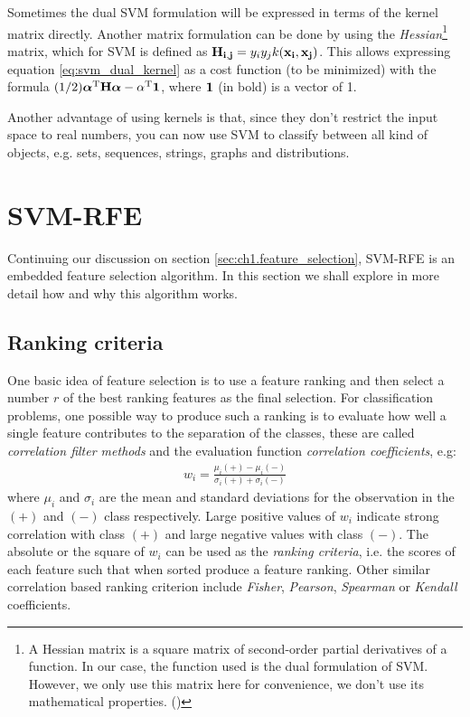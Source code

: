 Sometimes the dual SVM formulation will be expressed in terms of the kernel matrix directly. Another matrix formulation can be done by using the \emph{Hessian}\footnote{A Hessian matrix is a square matrix of second-order partial derivatives of a function. In our case, the function used is the dual formulation of SVM. However, we only use this matrix here for convenience, we don't use its mathematical properties. (\cite{sontag_kernel_2013})} matrix, which for SVM is defined as $\mathbf{H_{i,j}} = y_iy_jk(\mathbf{x_i}, \mathbf{x_j})$. This allows expressing equation \ref{eq:svm_dual_kernel} as a cost function (to be minimized) with the formula $(1/2) \boldsymbol{\alpha}^{\text{T}} \mathbf{H} \boldsymbol{\alpha} - \alpha^{\text{T}} \mathbf{1}$, where $\mathbf{1}$ (in bold) is a vector of 1.

Another advantage of using kernels is that, since they don't restrict the input space to real numbers, you can now use SVM to classify between all kind of objects, e.g. sets, sequences, strings, graphs and distributions.

\section{SVM-RFE}

Continuing our discussion on section \ref{sec:ch1.feature_selection}, SVM-RFE is an embedded feature se\-lec\-tion algorithm. In this section we shall explore in more detail how and why this algorithm works.

\subsection{Ranking criteria}
\label{sec:ch4.rfe.criteria}

One basic idea of feature selection is to use a feature ranking and then select a number $r$ of the best ranking features as the final selection. For classification prob\-lems, one possible way to produce such a ranking is to evaluate how well a single feature contributes to the separation of the classes, these are called \emph{correlation filter methods} and the evaluation function \emph{correlation coefficients}, e.g:
\begin{align*}
    w_i = \frac{\mu_i(+) - \mu_i(-)}{\sigma_i(+) + \sigma_i(-)} 
\end{align*}
where $\mu_i$ and $\sigma_i$ are the mean and standard deviations for the observation in the $(+)$ and $(-)$ class respectively. Large positive values of $w_i$ indicate strong correlation with class $(+)$ and large negative values with class $(-)$. The absolute or the square of $w_i$ can be used as the \emph{ranking criteria}, i.e. the scores of each feature such that when sorted produce a feature ranking. Other similar correlation based ranking criterion include \emph{Fisher}, \emph{Pearson}, \emph{Spearman} or \emph{Kendall} coefficients.

